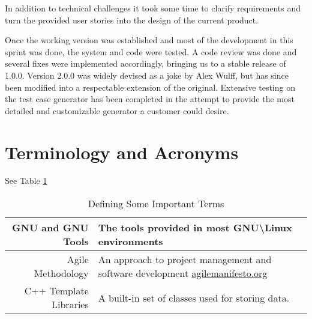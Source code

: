 In addition to technical challenges it took some time to clarify requirements and turn the provided user stories into the design of the current product.

Once the working version was established and most of the development in this sprint was done, the system and code were tested. A code review was done and several fixes were implemented accordingly, bringing us to a stable release of 1.0.0.  Version 2.0.0 was widely devised as a joke by Alex Wulff, but has since been modified into a respectable extension of the original.  Extensive testing on the test case generator has been completed in the attempt to provide the most detailed and customizable generator a customer could desire.


\section{Terminology and Acronyms}
See Table \ref{terms}
\begin{table}[tbh]
\begin{center}
\begin{tabular}{|r|l|}
\hline
    GNU and GNU Tools & The tools provided in most GNU\textbackslash Linux environments \\ \hline
    Agile Methodology & An approach to project management and software development \url{agilemanifesto.org} \\ \hline
    C++ Template Libraries & A built-in set of classes used for storing data. \\
    \hline
\end{tabular}
\caption{Defining Some Important Terms \label{terms}}
\end{center}
\end{table}
